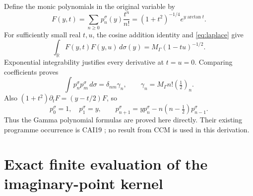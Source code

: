 \documentclass[11pt]{article}
\newcommand{\R}{\mathbb R}
\begin{document}
Define the monic polynomials in the original variable by
\begin{equation}\label{eq:gen}
 F(y,t)=\sum_{n\ge0}p_n^\sigma(y)\frac{t^n}{n!}
 =(1+t^2)^{-1/4}e^{y\arctan t}.
\end{equation}
For sufficiently small real $t,u$, the cosine addition identity and
\eqref{eq:laplace} give
\[
 \int_{\R}F(y,t)F(y,u)\,d\sigma(y)=M_\Gamma(1-tu)^{-1/2}.
\]
Exponential integrability justifies every derivative at $t=u=0$.
Comparing coefficients proves
\begin{equation}\label{eq:norms}
 \int p_n^\sigma p_m^\sigma\,d\sigma
 =\delta_{nm}\gamma_n,
 \qquad \gamma_n=M_\Gamma n!(\tfrac12)_n.
\end{equation}
Also $(1+t^2)\partial_tF=(y-t/2)F$, so
\begin{equation}\label{eq:monicrec}
 p_0^\sigma=1,\quad p_1^\sigma=y,\qquad
 p_{n+1}^\sigma=yp_n^\sigma-n(n-\tfrac12)p_{n-1}^\sigma.
\end{equation}
Thus the Gamma polynomial formulas are proved here directly.  Their
existing programme occurrence is CAI19 \cite{CAI}; no result from CCM
is used in this derivation.

\section{Exact finite evaluation of the imaginary-point kernel}
\end{document}

